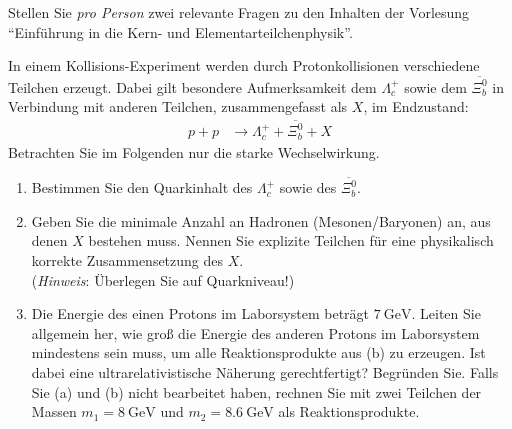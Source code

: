 \documentclass{exercise}
\begin{document}
\clearpage
\makeheader

Stellen Sie \emph{pro Person} zwei relevante Fragen zu den Inhalten der Vorlesung \enquote{Einf\"uhrung in die Kern- und Elementarteilchenphysik}.


\newpage
{}

    In einem Kollisions-Experiment werden durch Protonkollisionen verschiedene Teilchen erzeugt. Dabei gilt besondere Aufmerksamkeit dem $\Lambda_c^+$ sowie dem $\overline{\Xi^{0}_{b}}$ in Verbindung mit anderen Teilchen, zusammengefasst als $X$, im Endzustand:
    \begin{align*}
    p+p & \rightarrow \Lambda_c^+ + \overline{\Xi^{0}_{b}}+X
    \end{align*}
    Betrachten Sie im Folgenden nur die starke Wechselwirkung.
    \begin{enumerate}
        \item Bestimmen Sie den Quarkinhalt des $\Lambda_c^+$ sowie des $\overline{\Xi^{0}_{b}}$.  
        \item Geben Sie die minimale Anzahl an Hadronen (Mesonen/Baryonen) an, aus denen $X$ bestehen muss. Nennen Sie explizite Teilchen für eine physikalisch korrekte Zusammensetzung des $X$. \\ (\emph{Hinweis}: Überlegen Sie auf Quarkniveau!)
        \item Die Energie des einen Protons im Laborsystem beträgt $\SI{7}{\giga\electronvolt}$. Leiten Sie allgemein her, wie groß die Energie des anderen Protons im Laborsystem mindestens sein muss, um alle Reaktionsprodukte aus (b) zu erzeugen. Ist dabei eine ultrarelativistische Näherung gerechtfertigt? Begründen Sie. Falls Sie (a) und (b) nicht bearbeitet haben, rechnen Sie mit zwei Teilchen der Massen $m_1 = \SI{8}{\giga\electronvolt}$ und $m_2 = \SI{8.6}{\giga\electronvolt}$ als Reaktionsprodukte.
    \end{enumerate}
\end{document}
